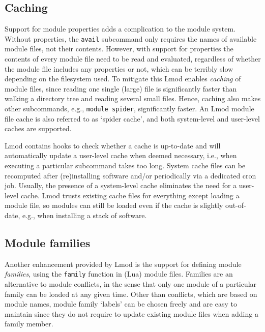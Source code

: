 \subsection{Caching}

Support for module properties adds a complication to the module
system.  Without properties, the \texttt{\small avail} subcommand only requires the
names of available module files, not their contents.  However, with support for
properties the contents of every module file need to be read and evaluated,
regardless of whether the module file includes any properties or not, which can
be terribly slow depending on the filesystem used.  To mitigate this Lmod enables
\emph{caching} of module files, since reading one single (large) file is
significantly faster than walking a directory tree and reading several small files.
Hence, caching also makes other subcommands, e.g., \texttt{\small module spider},
significantly faster. An Lmod module file cache is also referred to as
`spider cache', and both system-level and user-level caches are supported.

Lmod contains hooks to check whether a cache is up-to-date and will automatically
update a user-level cache when deemed necessary, i.e., when executing a particular
subcommand takes too long. System cache files can be recomputed after (re)installing software and/or periodically via a dedicated cron job. Usually, the presence of a
system-level cache eliminates the need for a user-level cache.
Lmod trusts existing cache files for everything except loading a module
file, so modules can still be loaded even if the cache is slightly out-of-date,
e.g., when installing a stack of software.


\subsection{Module families}

Another enhancement provided by Lmod is the support for defining module
\emph{families}, using the \texttt{\small family} function in (Lua) module files.
Families are an alternative to module conflicts, in the sense that only one module of
a particular family can be loaded at any given time. Other than conflicts, which
are based on module names, module family `labels' can be chosen freely and are easy
to maintain since they do not require to update existing module files when adding a
family member.

